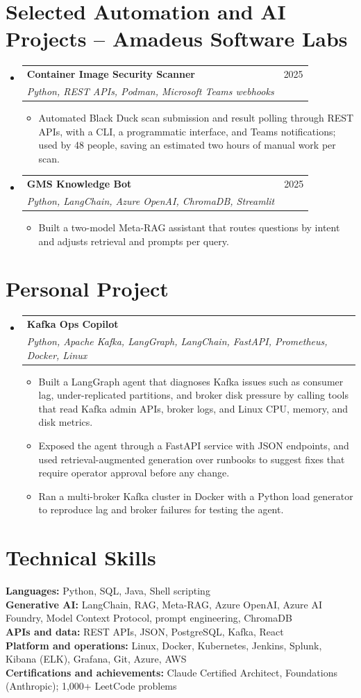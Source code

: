 \documentclass[a4paper,11pt]{article}
\makeatletter
\newcommand{\entry}[4]{\item\begin{tabularx}{\textwidth}{@{}Xr@{}}\textbf{#1}& #2\\\textit{\small #3}&\textit{\small #4}\end{tabularx}\vspace{-5pt}}
\newcommand{\bulletpoint}[1]{\item\small{#1}}
\makeatother
\begin{document}
\section{Selected Automation and AI Projects -- Amadeus Software Labs}
\begin{itemize}[leftmargin=0in,label={}]
  \entry{Container Image Security Scanner}{2025}{Python, REST APIs, Podman, Microsoft Teams webhooks}{}
  \begin{itemize}
    \bulletpoint{Automated Black Duck scan submission and result polling through REST APIs, with a CLI, a programmatic interface, and Teams notif{}ications; used by 48 people, saving an estimated two hours of manual work per scan.}
  \end{itemize}
  \entry{GMS Knowledge Bot}{2025}{Python, LangChain, Azure OpenAI, ChromaDB, Streamlit}{}
  \begin{itemize}
    \bulletpoint{Built a two-model Meta-RAG assistant that routes questions by intent and adjusts retrieval and prompts per query.}
  \end{itemize}
\end{itemize}

\section{Personal Project}
\begin{itemize}[leftmargin=0in,label={}]
  \entry{Kafka Ops Copilot}{}{Python, Apache Kafka, LangGraph, LangChain, FastAPI, Prometheus, Docker, Linux}{}
  \begin{itemize}
    \bulletpoint{Built a LangGraph agent that diagnoses Kafka issues such as consumer lag, under-replicated partitions, and broker disk pressure by calling tools that read Kafka admin APIs, broker logs, and Linux CPU, memory, and disk metrics.}
    \bulletpoint{Exposed the agent through a FastAPI service with JSON endpoints, and used retrieval-augmented generation over runbooks to suggest f{}ixes that require operator approval before any change.}
    \bulletpoint{Ran a multi-broker Kafka cluster in Docker with a Python load generator to reproduce lag and broker failures for testing the agent.}
  \end{itemize}
\end{itemize}

\section{Technical Skills}
\small\textbf{Languages:} Python, SQL, Java, Shell scripting \\
\textbf{Generative AI:} LangChain, RAG, Meta-RAG, Azure OpenAI, Azure AI Foundry, Model Context Protocol, prompt engineering, ChromaDB \\
\textbf{APIs and data:} REST APIs, JSON, PostgreSQL, Kafka, React \\
\textbf{Platform and operations:} Linux, Docker, Kubernetes, Jenkins, Splunk, Kibana (ELK), Grafana, Git, Azure, AWS \\
\textbf{Certif{}ications and achievements:} Claude \mbox{Certif{}ied} Architect, Foundations (Anthropic); 1,000+ LeetCode problems
\end{document}
